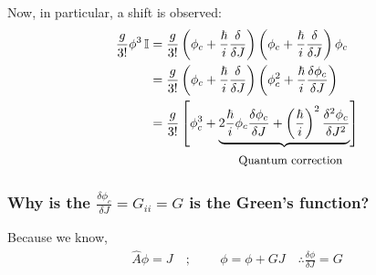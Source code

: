 \documentclass[14pt]{article} %
\begin{document}
Now, in particular, a shift is observed:
\begin{align*}
\frac{g}{3!} \phi^3 \, \mathbb{I}
&= \frac{g}{3!} \left( \phi_c + \frac{\hbar}{i} \frac{\delta}{\delta J} \right)
\left( \phi_c + \frac{\hbar}{i} \frac{\delta}{\delta J} \right) \phi_c
\\
&= \frac{g}{3!} \left( \phi_c + \frac{\hbar}{i} \frac{\delta}{\delta J} \right)
\left( \phi_c^2 + \frac{\hbar}{i} \frac{\delta \phi_c}{\delta J} \right)
\\
&= \frac{g}{3!} \left[ \phi_c^3 + \underbrace{2 \frac{\hbar}{i} \phi_c \frac{\delta \phi_c}{\delta J} + \left( \frac{\hbar}{i} \right)^2 \frac{\delta^2 \phi_c}{\delta J^2}} \right] \\
& \qquad \qquad \qquad \quad\small\text{Quantum correction}
\end{align*}
\begin{tcolorbox}
\subsubsection*{Why is the $\frac{\delta \phi_c}{\delta J} = G_{ii} = G$ is the Green's function?}
Because we know,
\begin{align*}
\hat{A} \phi = J \quad; \quad &~~\phi = \phi + GJ \quad \therefore \frac{\delta \phi}{\delta J} = G
\end{align*}
\end{tcolorbox}
\end{document}

